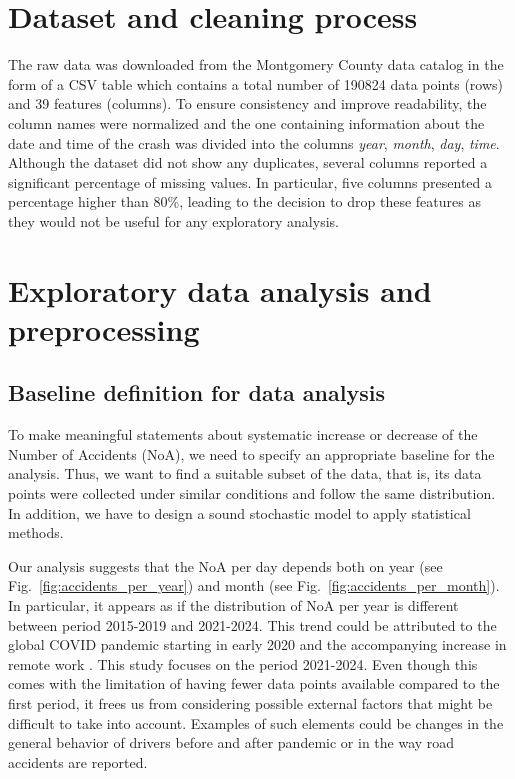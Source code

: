 \documentclass{article}
\begin{document}
\section{Dataset and cleaning process}
The raw data was downloaded from the Montgomery County data catalog
\cite{dataset} in the form of a CSV table which contains a total number of
190824 data points (rows) and 39 features (columns). To ensure consistency and
improve readability, the column names were normalized and the one containing
information about the date and time of the crash was divided into the columns
\emph{year}, \emph{month}, \emph{day}, \emph{time}. Although the dataset did not
show any duplicates, several columns reported a significant percentage of
missing values. In particular, five columns presented a percentage higher than
80\%, leading to the decision to drop these features as they would not be useful
for any exploratory analysis.

\section{Exploratory data analysis and preprocessing}
\subsection{Baseline definition for data analysis}
To make meaningful statements about systematic increase or decrease of the
Number of Accidents (NoA), we need to specify an appropriate baseline for the
analysis. Thus, we want to find a suitable subset of the data, that is, its data
points were collected under similar conditions and follow the same distribution.
In addition, we have to design a sound stochastic model to apply statistical
methods.

Our analysis suggests that the NoA per day depends both on year (see
Fig.~\ref{fig:accidents_per_year}) and month (see
Fig.~\ref{fig:accidents_per_month}). In particular, it appears as if the
distribution of NoA per year is different between period 2015-2019 and
2021-2024. This trend could be attributed to the global COVID pandemic starting
in early 2020 and the accompanying increase in remote work \cite{workfromhome}.
This study focuses on the period 2021-2024. Even though this comes with the
limitation of having fewer data points available compared to the first period,
it frees us from considering possible external factors that might be difficult
to take into account. Examples of such elements could be changes in the general
behavior of drivers before and after pandemic or in the way road accidents are
reported.
\end{document}

